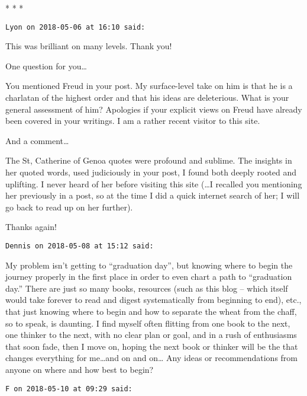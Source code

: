
\begin{center}* * *\end{center}

\begin{footnotesize}\begin{sffamily}



\texttt{Lyon on 2018-05-06 at 16:10 said: }

This was brilliant on many levels. Thank you! 

One question for you…

You mentioned Freud in your post. My surface-level take on him is that he is a charlatan of the highest order and that his ideas are deleterious. What is your general assessment of him? Apologies if your explicit views on Freud have already been covered in your writings. I am a rather recent visitor to this site.

And a comment…

The St, Catherine of Genoa quotes were profound and sublime. The insights in her quoted words, used judiciously in your post, I found both deeply rooted and uplifting. I never heard of her before visiting this site (…I recalled you mentioning her previously in a post, so at the time I did a quick internet search of her; I will go back to read up on her further).

Thanks again!


\hfill

\texttt{Dennis on 2018-05-08 at 15:12 said: }

My problem isn't getting to “graduation day”, but knowing where to begin the journey properly in the first place in order to even chart a path to “graduation day.” There are just so many books, resources (such as this blog – which itself would take forever to read and digest systematically from beginning to end), etc., that just knowing where to begin and how to separate the wheat from the chaff, so to speak, is daunting. I find myself often flitting from one book to the next, one thinker to the next, with no clear plan or goal, and in a rush of enthusiasms that soon fade, then I move on, hoping the next book or thinker will be the that changes everything for me…and on and on… Any ideas or recommendations from anyone on where and how best to begin?


\hfill

\texttt{F on 2018-05-10 at 09:29 said: }


\end{sffamily}
\end{footnotesize}
